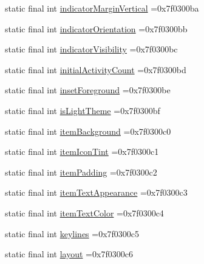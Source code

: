 \begin{DoxyCompactItemize}
\item 
static final int \mbox{\hyperlink{classcom_1_1example_1_1trainawearapplication_1_1_r_1_1attr_a83df8b81af7cb1a0b0176af0b3dbe6ca}{indicator\+Margin\+Vertical}} =0x7f0300ba
\item 
static final int \mbox{\hyperlink{classcom_1_1example_1_1trainawearapplication_1_1_r_1_1attr_aa43a016e62b9a649d5ebd9772e9c59d6}{indicator\+Orientation}} =0x7f0300bb
\item 
static final int \mbox{\hyperlink{classcom_1_1example_1_1trainawearapplication_1_1_r_1_1attr_a484a75b7a68b24729c613f4b21412d0b}{indicator\+Visibility}} =0x7f0300bc
\item 
static final int \mbox{\hyperlink{classcom_1_1example_1_1trainawearapplication_1_1_r_1_1attr_a25a83d8b3679480c75ced039a9564cb0}{initial\+Activity\+Count}} =0x7f0300bd
\item 
static final int \mbox{\hyperlink{classcom_1_1example_1_1trainawearapplication_1_1_r_1_1attr_a8897a08b00504b9242fc799e0e53c48e}{inset\+Foreground}} =0x7f0300be
\item 
static final int \mbox{\hyperlink{classcom_1_1example_1_1trainawearapplication_1_1_r_1_1attr_a0022e702c6ffefa6c69963eed311437e}{is\+Light\+Theme}} =0x7f0300bf
\item 
static final int \mbox{\hyperlink{classcom_1_1example_1_1trainawearapplication_1_1_r_1_1attr_ab1cb963f996615386ef9951786344a9b}{item\+Background}} =0x7f0300c0
\item 
static final int \mbox{\hyperlink{classcom_1_1example_1_1trainawearapplication_1_1_r_1_1attr_aa887ec7a0af320b30f79dd996a18ea37}{item\+Icon\+Tint}} =0x7f0300c1
\item 
static final int \mbox{\hyperlink{classcom_1_1example_1_1trainawearapplication_1_1_r_1_1attr_a6b6da39404562545f9f51cf78522189c}{item\+Padding}} =0x7f0300c2
\item 
static final int \mbox{\hyperlink{classcom_1_1example_1_1trainawearapplication_1_1_r_1_1attr_ae7ecd82e57ffd58e4377e7bcec9c6480}{item\+Text\+Appearance}} =0x7f0300c3
\item 
static final int \mbox{\hyperlink{classcom_1_1example_1_1trainawearapplication_1_1_r_1_1attr_ad6d1eeb7d218baf7075cb5ef6014e9f4}{item\+Text\+Color}} =0x7f0300c4
\item 
static final int \mbox{\hyperlink{classcom_1_1example_1_1trainawearapplication_1_1_r_1_1attr_afae5632614c6ea1d35d0f93841099ba3}{keylines}} =0x7f0300c5
\item 
static final int \mbox{\hyperlink{classcom_1_1example_1_1trainawearapplication_1_1_r_1_1attr_aa64f605ae1fcd6070e553cfdcbd37759}{layout}} =0x7f0300c6

\end{DoxyCompactItemize}
